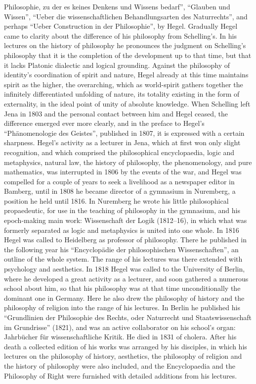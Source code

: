 Philosophie, zu der es keines Denkens und Wissens bedarf'',
``Glauben und Wissen'', ``Ueber die wissenschaftlichen
Behandlungsarten des Naturrechts'', and perhaps ``Ueber Construction in
der Philosophie'', by Hegel. Gradually Hegel came to clarity about the
difference of his philosophy from Schelling's. In his lectures on the
history of philosophy he pronounces the judgment on Schelling's
philosophy that it is the completion of the development up to that
time, but that it lacks Platonic dialectic and logical grounding.
Against the philosophy of identity's coordination of spirit and nature,
Hegel already at this time maintains spirit as the higher, the
overarching, which as world-spirit gathers together the infinitely
differentiated unfolding of nature, its totality existing in the form
of externality, in the ideal point of unity of absolute knowledge. When
Schelling left Jena in 1803 and the personal contact between him and
Hegel ceased, the difference emerged ever more clearly, and in the
preface to Hegel's ``Phänomenologie des Geistes'', published in 1807,
it is expressed with a certain sharpness. Hegel's activity as a lecturer
in Jena, which at first won only slight recognition, and which comprised
the philosophical encyclopaedia, logic and metaphysics, natural law, the
history of philosophy, the phenomenology, and pure mathematics, was
interrupted in 1806 by the events of the war, and Hegel was compelled
for a couple of years to seek a livelihood as a newspaper editor in
Bamberg, until in 1808 he became director of a gymnasium in Nuremberg,
a position he held until 1816. In Nuremberg he wrote his little
philosophical propaedeutic, for use in the teaching of philosophy in the
gymnasium, and his epoch-making main work: Wissenschaft der Logik
(1812--16), in which what was formerly separated as logic and
metaphysics is united into one whole. In 1816 Hegel was called to
Heidelberg as professor of philosophy. There he published in the
following year his ``Encyclopädie der philosophischen Wissenschaften'',
an outline of the whole system. The range of his lectures was there
extended with psychology and aesthetics. In 1818 Hegel was called to the
University of Berlin, where he developed a great activity as
a lecturer, and soon gathered a numerous school about him, so that his
philosophy was at that time unconditionally the dominant one in
Germany. Here he also drew the philosophy of history and the philosophy
of religion into the range of his lectures. In Berlin he published his
``Grundlinien der Philosophie des Rechts, oder Naturrecht und
Staatswissenschaft im Grundrisse''
(1821), and was an active collaborator on his school's organ:
Jahrbücher für wissenschaftliche Kritik. He died in 1831 of cholera.
After his death a collected edition of his works was arranged by his
disciples, in which his lectures on the philosophy of history,
aesthetics, the philosophy of religion and the history of philosophy
were also included, and the Encyclopaedia and the Philosophy of Right
were furnished with detailed additions from his lectures.


